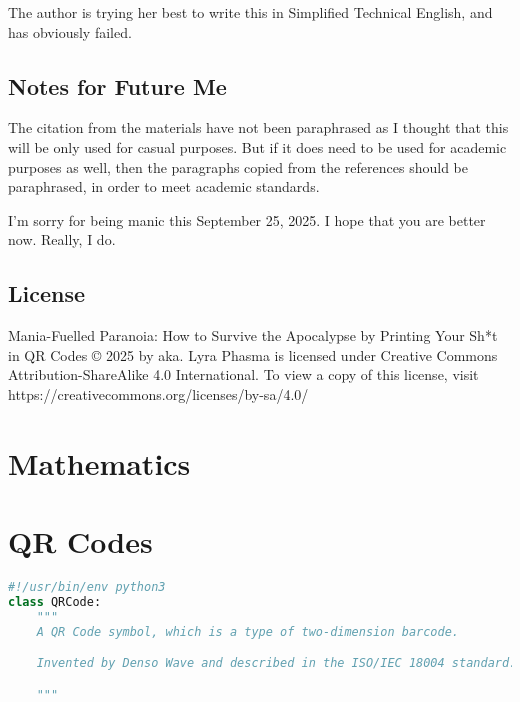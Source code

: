 \documentclass[a4paper,oneside,english]{book}
\begin{document}
The author is trying her best to write this in Simplified Technical English, and has obviously failed.

\section{Notes for Future Me}

The citation from the materials have not been paraphrased as I thought that this will be only used for casual purposes. But if it does need to be used for academic purposes as well, then the paragraphs copied from the references should be paraphrased, in order to meet academic standards.

I'm sorry for being manic this September 25, 2025. I hope that you are better now. Really, I do.

\section{License}

Mania-Fuelled Paranoia: How to Survive the Apocalypse by Printing Your Sh*t in QR Codes © 2025 by aka. Lyra Phasma is licensed under Creative Commons Attribution-ShareAlike 4.0 International. To view a copy of this license, visit https://creativecommons.org/licenses/by-sa/4.0/


\chapter{Mathematics}



\chapter{QR Codes}



\begin{lstlisting}[style=papercolor-light, language=Python, caption=Slay the print loop]
#!/usr/bin/env python3
class QRCode:
    """
    A QR Code symbol, which is a type of two-dimension barcode.

    Invented by Denso Wave and described in the ISO/IEC 18004 standard. Instances of this class represent an immutable square grid of dark and light cells. The class provides static factory functions to create a QR Code from text or binary data. The class covers the QR Code Model 2 specification, supporting all versions (sizes) from 1 to 40, all 4 error correction levels, and 4 character encoding modes.

    """
\end{lstlisting}
\end{document}
